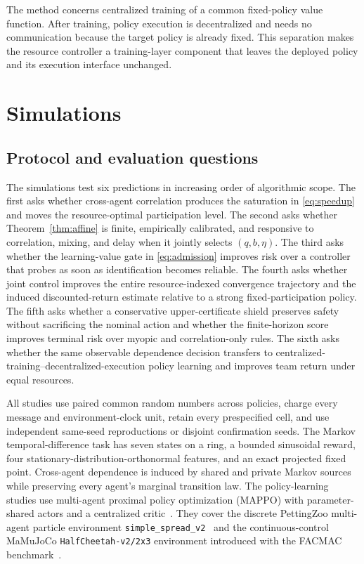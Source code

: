 \documentclass[journal]{IEEEtran}
\begin{document}
The method concerns centralized training of a common fixed-policy value function.
After training, policy execution is decentralized and needs no communication because the target policy is already fixed.
This separation makes the resource controller a training-layer component that leaves the deployed policy and its execution interface unchanged.

\section{Simulations}
\subsection{Protocol and evaluation questions}
The simulations test six predictions in increasing order of algorithmic scope.
The first asks whether cross-agent correlation produces the saturation in \eqref{eq:speedup} and moves the resource-optimal participation level.
The second asks whether Theorem~\ref{thm:affine} is finite, empirically calibrated, and responsive to correlation, mixing, and delay when it jointly selects $(q,b,\eta)$.
The third asks whether the learning-value gate in \eqref{eq:admission} improves risk over a controller that probes as soon as identification becomes reliable.
The fourth asks whether joint control improves the entire resource-indexed convergence trajectory and the induced discounted-return estimate relative to a strong fixed-participation policy.
The fifth asks whether a conservative upper-certificate shield preserves safety without sacrificing the nominal action and whether the finite-horizon score improves terminal risk over myopic and correlation-only rules.
The sixth asks whether the same observable dependence decision transfers to centralized-training--decentralized-execution policy learning and improves team return under equal resources.

All studies use paired common random numbers across policies, charge every message and environment-clock unit, retain every prespecified cell, and use independent same-seed reproductions or disjoint confirmation seeds.
The Markov temporal-difference task has seven states on a ring, a bounded sinusoidal reward, four stationary-distribution-orthonormal features, and an exact projected fixed point.
Cross-agent dependence is induced by shared and private Markov sources while preserving every agent's marginal transition law.
The policy-learning studies use multi-agent proximal policy optimization (MAPPO) with parameter-shared actors and a centralized critic~\cite{yu2022mappo}.
They cover the discrete PettingZoo multi-agent particle environment \texttt{simple\_spread\_v2}~\cite{terry2021pettingzoo} and the continuous-control MaMuJoCo \texttt{HalfCheetah-v2/2x3} environment introduced with the FACMAC benchmark~\cite{peng2021facmac}.
\end{document}
